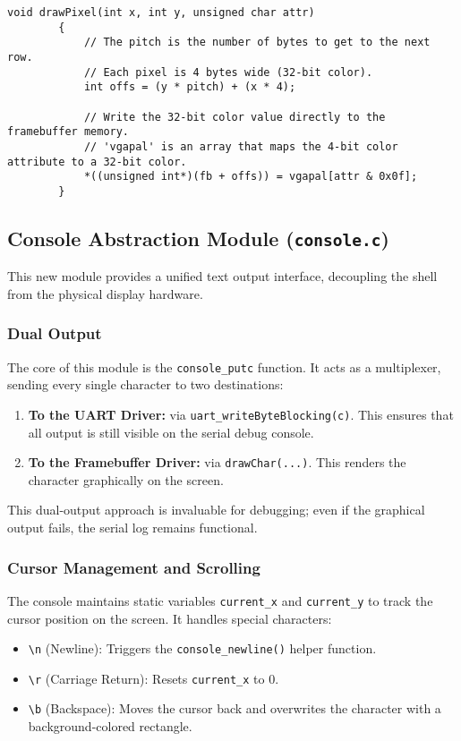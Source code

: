 \documentclass[a4paper, 11pt]{article}
\begin{document}
	\begin{lstlisting}[style=cstyle, caption={Calculating the memory offset for a pixel.}]
		void drawPixel(int x, int y, unsigned char attr)
		{
			// The pitch is the number of bytes to get to the next row.
			// Each pixel is 4 bytes wide (32-bit color).
			int offs = (y * pitch) + (x * 4);
			
			// Write the 32-bit color value directly to the framebuffer memory.
			// 'vgapal' is an array that maps the 4-bit color attribute to a 32-bit color.
			*((unsigned int*)(fb + offs)) = vgapal[attr & 0x0f];
		}
	\end{lstlisting}
	
	\subsection{Console Abstraction Module (\texttt{console.c})}
	This new module provides a unified text output interface, decoupling the shell from the physical display hardware.
	
	\subsubsection{Dual Output}
	The core of this module is the \texttt{console\_putc} function. It acts as a multiplexer, sending every single character to two destinations:
	\begin{enumerate}
		\item \textbf{To the UART Driver:} via \texttt{uart\_writeByteBlocking(c)}. This ensures that all output is still visible on the serial debug console.
		\item \textbf{To the Framebuffer Driver:} via \texttt{drawChar(...)}. This renders the character graphically on the screen.
	\end{enumerate}
	This dual-output approach is invaluable for debugging; even if the graphical output fails, the serial log remains functional.
	
	\subsubsection{Cursor Management and Scrolling}
	The console maintains static variables \texttt{current\_x} and \texttt{current\_y} to track the cursor position on the screen. It handles special characters:
	\begin{itemize}
		\item \texttt{\textbackslash n} (Newline): Triggers the \texttt{console\_newline()} helper function.
		\item \texttt{\textbackslash r} (Carriage Return): Resets \texttt{current\_x} to 0.
		\item \texttt{\textbackslash b} (Backspace): Moves the cursor back and overwrites the character with a background-colored rectangle.
	\end{itemize}
	
\end{document}
